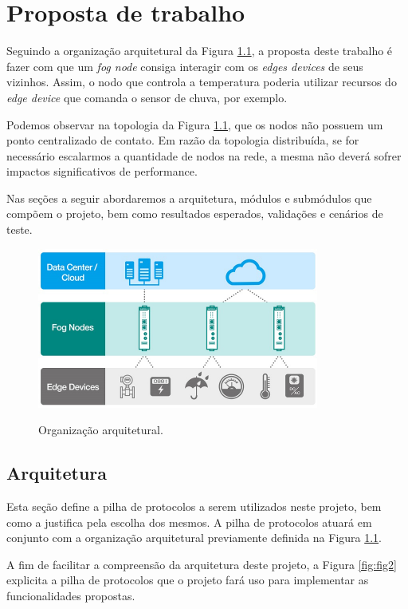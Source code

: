 \chapter{\label{chap:chap3} Proposta de trabalho}

Seguindo a organização arquitetural da Figura \ref{fig:fig1}, a proposta deste trabalho é fazer com que um \textit{fog node} consiga interagir com os \textit{edges devices} de seus vizinhos.
Assim, o nodo que controla a temperatura poderia utilizar recursos do \textit{edge device} que comanda o sensor de chuva, por exemplo.

Podemos observar na topologia da Figura \ref{fig:fig1}, que os nodos não possuem um ponto centralizado de contato.
Em razão da topologia distribuída, se for necessário escalarmos a quantidade de nodos na rede, a mesma não deverá sofrer impactos significativos de performance.

Nas seções a seguir abordaremos a arquitetura, módulos e submódulos que compõem o projeto, bem como resultados esperados, validações e cenários de teste. 

\begin{figure}[htb!]
    \centering\includegraphics[width=.75\textwidth]{fig1.pdf}
    \caption
    {\label{fig:fig1} Organização arquitetural.} \cite{archfog:2017}
\end{figure}

\section{Arquitetura}

Esta seção define a pilha de protocolos a serem utilizados neste projeto, bem como a justifica pela escolha dos mesmos.
A pilha de protocolos atuará em conjunto com a organização arquitetural previamente definida na Figura \ref{fig:fig1}.

A fim de facilitar a compreensão da arquitetura deste projeto, a Figura \ref{fig:fig2} explicita a pilha de protocolos que o projeto fará uso para implementar as funcionalidades propostas.


